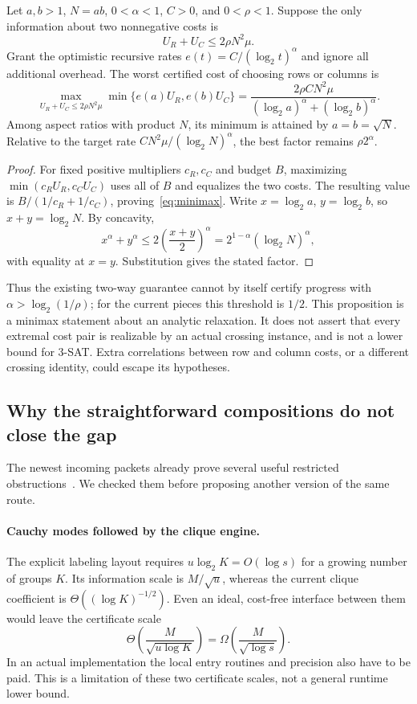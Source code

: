 \begin{proposition}\label{prop:rectbarrier}
Let $a,b>1$, $N=ab$, $0<\alpha<1$, $C>0$, and $0<\rho<1$.
Suppose the only information about two nonnegative costs is
\[
 U_R+U_C\le2\rho N^2\mu.
\]
Grant the optimistic recursive rates $e(t)=C/(\log_2t)^\alpha$ and
ignore all additional overhead. The worst certified cost of choosing
rows or columns is
\begin{equation}\label{eq:minimax}
 \max_{U_R+U_C\le2\rho N^2\mu}
       \min\{e(a)U_R,e(b)U_C\}
 =\frac{2\rho C N^2\mu}
        { (\log_2a)^\alpha+(\log_2b)^\alpha}.
\end{equation}
Among aspect ratios with product $N$, its minimum is attained by
$a=b=\sqrt N$. Relative to the target rate
$CN^2\mu/(\log_2N)^\alpha$, the best factor remains
$\rho2^\alpha$.
\end{proposition}

\begin{proof}
For fixed positive multipliers $c_R,c_C$ and budget $B$, maximizing
$\min(c_RU_R,c_CU_C)$ uses all of $B$ and equalizes the two costs.
The resulting value is $B/(1/c_R+1/c_C)$, proving~\eqref{eq:minimax}.
Write $x=\log_2a$, $y=\log_2b$, so $x+y=\log_2N$. By concavity,
\[
 x^\alpha+y^\alpha
 \le2\left(\frac{x+y}{2}\right)^\alpha
 =2^{1-\alpha}(\log_2N)^\alpha,
\]
with equality at $x=y$. Substitution gives the stated factor.
\end{proof}

Thus the existing two-way guarantee cannot by itself certify progress
with $\alpha>\log_2(1/\rho)$; for the current pieces this threshold is
$1/2$. This proposition is a minimax statement about an analytic
relaxation. It does not assert that every extremal cost pair is realizable
by an actual crossing instance, and is not a lower bound for 3-SAT. Extra
correlations between row and column costs, or a different crossing
identity, could escape its hypotheses.

\subsection{Why the straightforward compositions do not close the gap}

The newest incoming packets already prove several useful restricted
obstructions~\cite{pairwise,affineplane,affinecauchy}. We checked them
before proposing another version of the same route.

\paragraph{Cauchy modes followed by the clique engine.}
The explicit labeling layout requires $u\log_2K=O(\log s)$ for a
growing number of groups $K$. Its information scale is $M/\sqrt u$,
whereas the current clique coefficient is
$\Theta((\log K)^{-1/2})$. Even an ideal, cost-free interface between
them would leave the certificate scale
\[
 \Theta\left(\frac{M}{\sqrt{u\log K}}\right)
 =\Omega\left(\frac{M}{\sqrt{\log s}}\right).
\]
In an actual implementation the local entry routines and precision also
have to be paid. This is a limitation of these two certificate scales,
not a general runtime lower bound.

